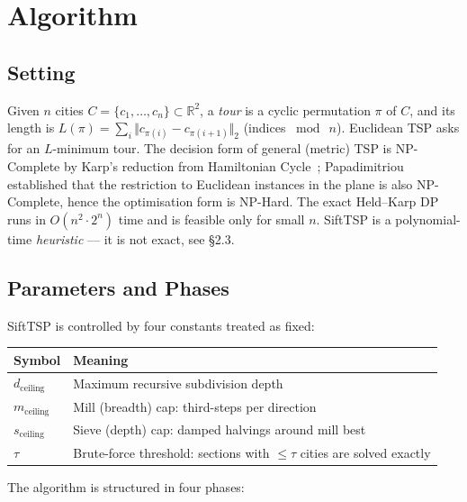 \documentclass[11pt,a4paper]{article}
\begin{document}
\section{Algorithm}

\subsection{Setting}

Given $n$ cities $C = \{c_1, \dots, c_n\} \subset \mathbb{R}^2$, a
\emph{tour} is a cyclic permutation $\pi$ of $C$, and its length is
$L(\pi) = \sum_i \Vert c_{\pi(i)} - c_{\pi(i+1)} \Vert_2$ (indices
$\bmod\ n$). Euclidean TSP asks for an $L$-minimum tour. The decision
form of general (metric) TSP is NP-Complete by Karp's reduction from
Hamiltonian Cycle~\cite{karp1972}; Papadimitriou~\cite{papadimitriou1977}
established that the restriction to Euclidean instances in the plane is
also NP-Complete, hence the optimisation form is NP-Hard. The exact
Held--Karp DP~\cite{heldkarp1962} runs in $O(n^2 \cdot 2^n)$ time and is
feasible only for small $n$. SiftTSP is a polynomial-time
\emph{heuristic} --- it is not exact, see \S2.3.

\subsection{Parameters and Phases}

SiftTSP is controlled by four constants treated as fixed:

\begin{center}
\begin{tabular}{ll}
\toprule
Symbol & Meaning \\
\midrule
$d_{\text{ceiling}}$ & Maximum recursive subdivision depth \\
$m_{\text{ceiling}}$ & Mill (breadth) cap: third-steps per direction \\
$s_{\text{ceiling}}$ & Sieve (depth) cap: damped halvings around mill best \\
$\tau$ & Brute-force threshold: sections with $\leq \tau$ cities are solved exactly \\
\bottomrule
\end{tabular}
\end{center}

The algorithm is structured in four phases:
\end{document}
